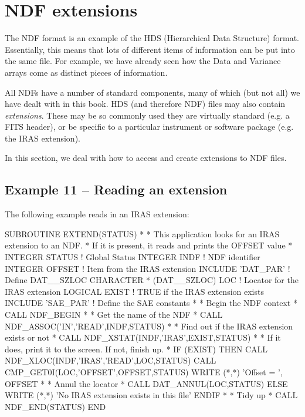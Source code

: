 \documentclass[11pt,nolof]{starlink}
\begin{document}
\section{NDF extensions}

The NDF format is an example of the HDS (Hierarchical Data Structure) format.
Essentially, this means that lots of different items of
information can be put into the same file. For example, we have
already seen how the Data and Variance arrays come as distinct pieces
of information.

All NDFs have a number of standard components, many of which (but not
all) we have dealt with in this book. HDS (and therefore NDF) files
may
also contain \emph{extensions}. These may be so commonly used they are
virtually standard (e.g. a FITS header), or be specific to a particular
instrument or software package (e.g. the IRAS extension).

In this section, we deal with how to access and create extensions to
NDF files.

\subsection{Example 11 -- Reading an extension}

The following example reads in an IRAS extension:

\begin{small}
\begin{terminalv}
       SUBROUTINE EXTEND(STATUS)
*
* This application looks for an IRAS extension to an NDF.
* If it is present, it reads and prints the OFFSET value
*
       INTEGER STATUS               ! Global Status
       INTEGER INDF                 ! NDF identifier
       INTEGER OFFSET               ! Item from the IRAS extension
       INCLUDE 'DAT_PAR'            ! Define DAT__SZLOC
       CHARACTER * (DAT__SZLOC) LOC ! Locator for the IRAS extension
       LOGICAL EXIST                ! TRUE if the IRAS extension exists
       INCLUDE 'SAE_PAR'            ! Define the SAE constants
*
* Begin the NDF context
*
       CALL NDF_BEGIN
*
* Get the name of the NDF
*
       CALL NDF_ASSOC('IN','READ',INDF,STATUS)
*
* Find out if the IRAS extension exists or not
*
       CALL NDF_XSTAT(INDF,'IRAS',EXIST,STATUS)
*
* If it does, print it to the screen. If not, finish up.
*
       IF (EXIST) THEN
         CALL NDF_XLOC(INDF,'IRAS','READ',LOC,STATUS)
         CALL CMP_GET0I(LOC,'OFFSET',OFFSET,STATUS)
         WRITE (*,*) 'Offset = ', OFFSET
*
* Annul the locator
*
         CALL DAT_ANNUL(LOC,STATUS)
       ELSE
         WRITE (*,*) 'No IRAS extension exists in this file'
       ENDIF
*
* Tidy up
*
       CALL NDF_END(STATUS)
       END
\end{terminalv}
\end{small}
\end{document}
